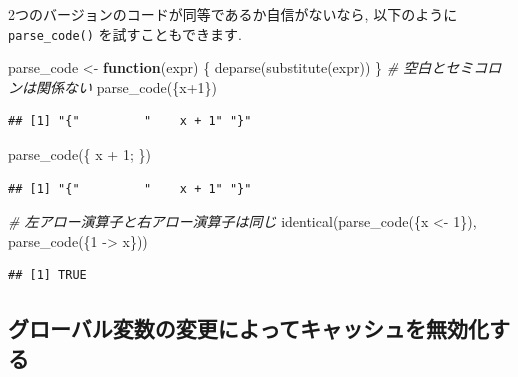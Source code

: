 \documentclass[
  11pt,
]{bxjsreport}
\newenvironment{Shaded}{\begin{snugshade}}{\end{snugshade}}
\newcommand{\CommentTok}[1]{\textcolor[rgb]{0.56,0.35,0.01}{\textit{#1}}}
\newcommand{\ControlFlowTok}[1]{\textcolor[rgb]{0.13,0.29,0.53}{\textbf{#1}}}
\newcommand{\DecValTok}[1]{\textcolor[rgb]{0.00,0.00,0.81}{#1}}
\newcommand{\FunctionTok}[1]{\textcolor[rgb]{0.00,0.00,0.00}{#1}}
\newcommand{\NormalTok}[1]{#1}
\newcommand{\OtherTok}[1]{\textcolor[rgb]{0.56,0.35,0.01}{#1}}
\newcommand{\SpecialCharTok}[1]{\textcolor[rgb]{0.00,0.00,0.00}{#1}}
\begin{document}
2つのバージョンのコードが同等であるか自信がないなら, 以下のように \texttt{parse\_code()} を試すこともできます.

\begin{Shaded}
\begin{Highlighting}[numbers=left,,]
\NormalTok{parse\_code }\OtherTok{\textless{}{-}} \ControlFlowTok{function}\NormalTok{(expr) \{}
  \FunctionTok{deparse}\NormalTok{(}\FunctionTok{substitute}\NormalTok{(expr))}
\NormalTok{\}}
\CommentTok{\# 空白とセミコロンは関係ない}
\FunctionTok{parse\_code}\NormalTok{(\{x}\SpecialCharTok{+}\DecValTok{1}\NormalTok{\})}
\end{Highlighting}
\end{Shaded}

\begin{verbatim}
## [1] "{"         "    x + 1" "}"
\end{verbatim}

\begin{Shaded}
\begin{Highlighting}[numbers=left,,]
\FunctionTok{parse\_code}\NormalTok{(\{ x   }\SpecialCharTok{+}    \DecValTok{1}\NormalTok{; \})}
\end{Highlighting}
\end{Shaded}

\begin{verbatim}
## [1] "{"         "    x + 1" "}"
\end{verbatim}

\begin{Shaded}
\begin{Highlighting}[numbers=left,,]
\CommentTok{\# 左アロー演算子と右アロー演算子は同じ}
\FunctionTok{identical}\NormalTok{(}\FunctionTok{parse\_code}\NormalTok{(\{x }\OtherTok{\textless{}{-}} \DecValTok{1}\NormalTok{\}), }\FunctionTok{parse\_code}\NormalTok{(\{}\DecValTok{1} \OtherTok{{-}\textgreater{}}\NormalTok{ x\}))}
\end{Highlighting}
\end{Shaded}

\begin{verbatim}
## [1] TRUE
\end{verbatim}

\hypertarget{ux30b0ux30edux30fcux30d0ux30ebux5909ux6570ux306eux5909ux66f4ux306bux3088ux3063ux3066ux30adux30e3ux30c3ux30b7ux30e5ux3092ux7121ux52b9ux5316ux3059ux308b}{%
\subsection{グローバル変数の変更によってキャッシュを無効化する}\label{ux30b0ux30edux30fcux30d0ux30ebux5909ux6570ux306eux5909ux66f4ux306bux3088ux3063ux3066ux30adux30e3ux30c3ux30b7ux30e5ux3092ux7121ux52b9ux5316ux3059ux308b}}
\end{document}
